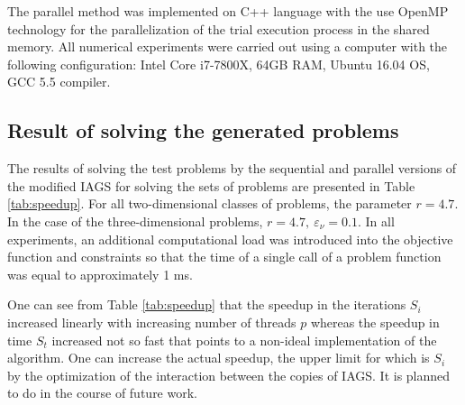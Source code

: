 \documentclass[runningheads]{llncs}
\begin{document}
The parallel method was implemented on C++ language with the use OpenMP technology for
the parallelization of the trial execution process in the shared memory.
All numerical experiments were carried out using a computer with the following  configuration:
Intel Core i7-7800X, 64GB RAM, Ubuntu 16.04 OS, GCC 5.5 compiler.

\subsection{Result of solving the generated problems}

The results of solving the test problems by the sequential and parallel versions of the modified
IAGS for solving the sets of problems are presented in Table \ref{tab:speedup}.
For all two-dimensional classes of problems, the parameter \(r=4.7\).
In the case of the three-dimensional problems, \(r=4.7,\: \varepsilon_\nu=0.1\).
In all experiments, an additional computational load was introduced into the objective function
and constraints so that the time of a single call of a problem function was equal to
approximately 1 ms.

One can see from Table \ref{tab:speedup} that the speedup in the iterations \(S_i\) increased
linearly with increasing number of threads \(p\) whereas the speedup in time \(S_t\) increased
not so fast that points to a non-ideal implementation of the algorithm.
One can increase the actual speedup, the upper limit for which is \(S_i\) by the optimization of
the interaction between the copies of IAGS. It is planned to do in the course of future work.
\end{document}
